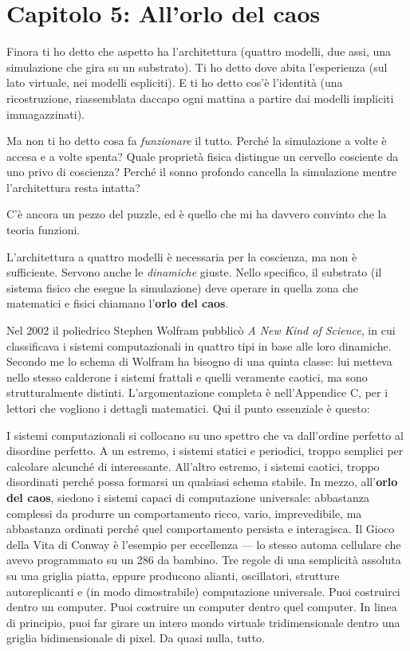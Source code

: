 \documentclass[11pt, twoside, openright]{book}
\begin{document}
\chapter*{Capitolo 5: All'orlo del caos}

Finora ti ho detto che aspetto ha l'architettura (quattro modelli, due assi, una simulazione che gira su un substrato). Ti ho detto dove abita l'esperienza (sul lato virtuale, nei modelli espliciti). E ti ho detto cos'è l'identità (una ricostruzione, riassemblata daccapo ogni mattina a partire dai modelli impliciti immagazzinati).

Ma non ti ho detto cosa fa \textit{funzionare} il tutto. Perché la simulazione a volte è accesa e a volte spenta? Quale proprietà fisica distingue un cervello cosciente da uno privo di coscienza? Perché il sonno profondo cancella la simulazione mentre l'architettura resta intatta?

C'è ancora un pezzo del puzzle, ed è quello che mi ha davvero convinto che la teoria funzioni.

L'architettura a quattro modelli è necessaria per la coscienza, ma non è sufficiente. Servono anche le \textit{dinamiche} giuste. Nello specifico, il substrato (il sistema fisico che esegue la simulazione) deve operare in quella zona che matematici e fisici chiamano l'\textbf{orlo del caos}.

Nel 2002 il poliedrico Stephen Wolfram pubblicò \textit{A New Kind of Science}, in cui classificava i sistemi computazionali in quattro tipi in base alle loro dinamiche. Secondo me lo schema di Wolfram ha bisogno di una quinta classe: lui metteva nello stesso calderone i sistemi frattali e quelli veramente caotici, ma sono strutturalmente distinti. L'argomentazione completa è nell'Appendice C, per i lettori che vogliono i dettagli matematici. Qui il punto essenziale è questo:

I sistemi computazionali si collocano su uno spettro che va dall'ordine perfetto al disordine perfetto. A un estremo, i sistemi statici e periodici, troppo semplici per calcolare alcunché di interessante. All'altro estremo, i sistemi caotici, troppo disordinati perché possa formarsi un qualsiasi schema stabile. In mezzo, all'\textbf{orlo del caos}, siedono i sistemi capaci di computazione universale: abbastanza complessi da produrre un comportamento ricco, vario, imprevedibile, ma abbastanza ordinati perché quel comportamento persista e interagisca. Il Gioco della Vita di Conway è l'esempio per eccellenza --- lo stesso automa cellulare che avevo programmato su un 286 da bambino. Tre regole di una semplicità assoluta su una griglia piatta, eppure producono alianti, oscillatori, strutture autoreplicanti e (in modo dimostrabile) computazione universale. Puoi costruirci dentro un computer. Puoi costruire un computer dentro quel computer. In linea di principio, puoi far girare un intero mondo virtuale tridimensionale dentro una griglia bidimensionale di pixel. Da quasi nulla, tutto.
\end{document}

